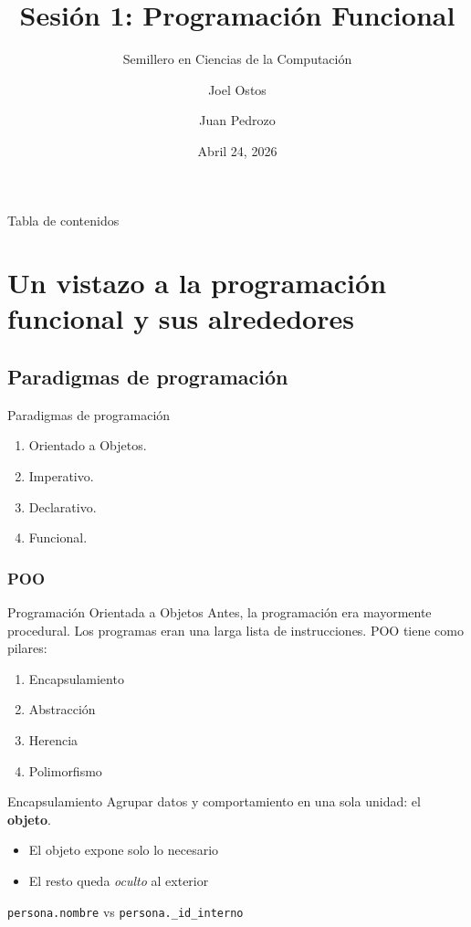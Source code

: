 \documentclass{beamer}
\title{Sesión 1: Programación Funcional }
\subtitle{  Semillero en Ciencias de la Computación }
\author[Ostos, Pedrozo ]{Joel Ostos \and Juan Pedrozo}
\date{ Abril 24, 2026 }
\begin{document}
\frame{\titlepage}

\begin{frame}{ Tabla de contenidos }
    \tableofcontents    
\end{frame}

\section{ Un vistazo a la programación funcional y sus alrededores }

\subsection{Paradigmas de programación}
\begin{frame}{Paradigmas de programación }
    \begin{enumerate}
        \item Orientado a Objetos.
        \item Imperativo.
        \item Declarativo.
        \item Funcional.
    \end{enumerate}
\end{frame}
\subsubsection{POO}
\begin{frame}{ Programación Orientada a Objetos }
    Antes, la programación era mayormente procedural. Los programas eran una larga lista de instrucciones.
    POO tiene como pilares:
    \begin{enumerate}
        \item Encapsulamiento
        \item Abstracción
        \item Herencia
        \item Polimorfismo
    \end{enumerate}
\end{frame}
\begin{frame}{Encapsulamiento}
    Agrupar datos y comportamiento en una sola unidad: el \textbf{objeto}.
    \begin{itemize}
        \item El objeto expone solo lo necesario
        \item El resto queda \textit{oculto} al exterior
    \end{itemize}
    \vspace{0.5em}
    \texttt{persona.nombre} \quad vs \quad \texttt{persona.\_id\_interno}
\end{frame}
\end{document}
